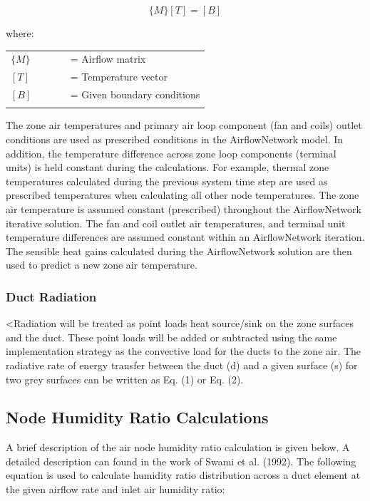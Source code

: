 \begin{equation}
\{ M\} [T] = [B]
\end{equation}

where:

\begin{tabular}{lp{0.7\linewidth}}
\\
$\{M\}$ &= Airflow matrix\\
$[T]$ &= Temperature vector\\
$[B]$ &= Given boundary conditions\\
\\
\end{tabular}

The zone air temperatures and primary air loop component (fan and coils) outlet conditions are used as prescribed conditions in the AirflowNetwork model. In addition, the temperature difference across zone loop components (terminal units) is held constant during the calculations. For example, thermal zone temperatures calculated during the previous system time step are used as prescribed temperatures when calculating all other node temperatures. The zone air temperature is assumed constant (prescribed) throughout the AirflowNetwork iterative solution. The fan and coil outlet air temperatures, and terminal unit temperature differences are assumed constant within an AirflowNetwork iteration. The sensible heat gains calculated during the AirflowNetwork solution are then used to predict a new zone air temperature.

\subsubsection{Duct Radiation}

<Radiation will be treated as point loads heat source/sink on the zone surfaces and the duct.  These point loads will be added or subtracted using the same implementation strategy as the convective load for the ducts to the zone air.  The radiative rate of energy transfer between the duct (d) and a given surface (s) for two grey surfaces can be written as Eq. (1) or Eq. (2).

\subsection{Node Humidity Ratio Calculations}\label{node-humidity-ratio-calculations}

A brief description of the air node humidity ratio calculation is given below. A detailed description can found in the work of Swami et al. (1992). The following equation is used to calculate humidity ratio distribution across a duct element at the given airflow rate and inlet air humidity ratio:

